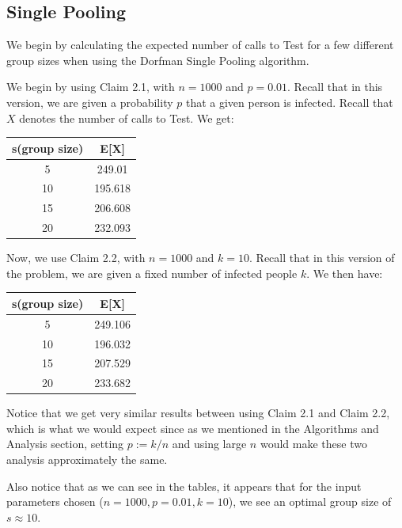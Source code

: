 \documentclass[12pt]{article}
\begin{document}
\subsection{Single Pooling}
We begin by calculating the expected number of calls to {\sf Test} for a few different group sizes when using the Dorfman Single Pooling algorithm.

We begin by using Claim 2.1, with $n=1000$ and $p=0.01$. Recall that in this version, we are given a probability $p$ that a given person is infected.
Recall that $X$ denotes the number of calls to {\sf Test}.
We get:

\begin{center}
 \begin{tabular}{||c c||} 

 \hline
 s(group size) & E[X] \\ [0.5ex] 
 \hline\hline
 5 & 249.01  \\ 
 \hline
 10 & 195.618 \\
 \hline
 15 & 206.608 \\
 \hline
 20 & 232.093 \\[1ex] 
 \hline
\end{tabular}
\end{center}

Now, we use Claim 2.2, with $n=1000$ and $k=10$. Recall that in this version of the problem, we are given a fixed number of infected people $k$. We then have:
\begin{center}
 \begin{tabular}{||c c||} 

 \hline
 s(group size) & E[X] \\ [0.5ex] 
 \hline\hline
 5 & 249.106  \\ 
 \hline
 10 & 196.032 \\
 \hline
 15 & 207.529 \\
 \hline
 20 & 233.682 \\[1ex] 
 \hline
\end{tabular}
\end{center}

Notice that we get very similar results between using Claim 2.1 and Claim 2.2, which is what we would expect since as we mentioned in the Algorithms and Analysis section, setting $p:=k/n$ and using large $n$ would make these two analysis approximately the same.

Also notice that as we can see in the tables, it appears that for the input parameters chosen ($n=1000, p=0.01, k=10$), we see an optimal group size of $s\approx10$.
\end{document}
